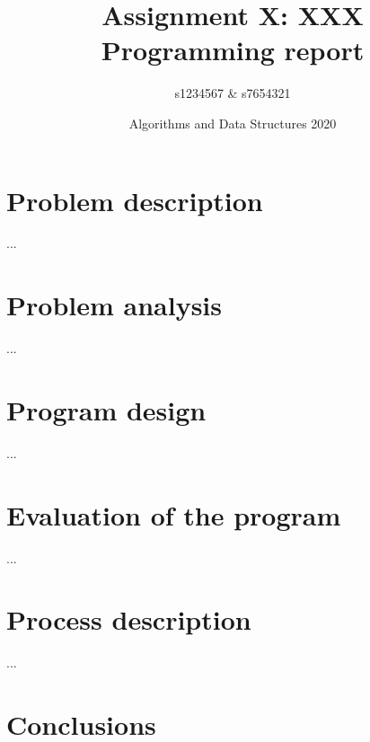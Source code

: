 \documentclass[a4paper]{article}
\begin{document}
\title{Assignment X: XXX \\ Programming report}
\author{s1234567 \& s7654321}
\date{Algorithms and Data Structures 2020}

\maketitle



\section{Problem description}

...

\section{Problem analysis}

...

\section{Program design}

...

\section{Evaluation of the program}

...

%

\section{Process description}

...

\section{Conclusions}
\end{document}
